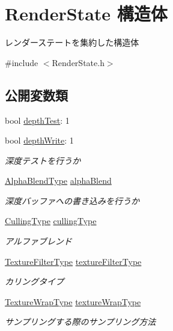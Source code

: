 \hypertarget{struct_render_state}{}\section{Render\+State 構造体}
\label{struct_render_state}


レンダーステートを集約した構造体  




{\ttfamily \#include $<$Render\+State.\+h$>$}

\subsection*{公開変数類}
\begin{DoxyCompactItemize}
\item 
bool \mbox{\hyperlink{struct_render_state_aa61ce61f3ea1393a390282c4812107bd}{depth\+Test}}\+: 1
\item 
bool \mbox{\hyperlink{struct_render_state_aa654d20df8b2f3405136082098b0397c}{depth\+Write}}\+: 1
\begin{DoxyCompactList}\small\item\em 深度テストを行うか \end{DoxyCompactList}\item 
\mbox{\hyperlink{_render_state_8h_a9700cc765f1d439500b41d8411f32036}{Alpha\+Blend\+Type}} \mbox{\hyperlink{struct_render_state_a7e18c4c10e6b76dedef6d8ffd519a7ca}{alpha\+Blend}}
\begin{DoxyCompactList}\small\item\em 深度バッファへの書き込みを行うか \end{DoxyCompactList}\item 
\mbox{\hyperlink{_render_state_8h_a09f66f004d665fd114424afb2fb42c75}{Culling\+Type}} \mbox{\hyperlink{struct_render_state_a2a951326c32d1319d5a7dd328db45ee2}{culling\+Type}}
\begin{DoxyCompactList}\small\item\em アルファブレンド \end{DoxyCompactList}\item 
\mbox{\hyperlink{_render_state_8h_a21d270ce58807e6b815650a47f4beba3}{Texture\+Filter\+Type}} \mbox{\hyperlink{struct_render_state_a22610d4664d4b8bc5481a75d782d5aef}{texture\+Filter\+Type}}
\begin{DoxyCompactList}\small\item\em カリングタイプ \end{DoxyCompactList}\item 
\mbox{\hyperlink{_render_state_8h_a7da0419d34309c6fd35bd55dcc01de2b}{Texture\+Wrap\+Type}} \mbox{\hyperlink{struct_render_state_a05e12034f4c324a83aa53d0da9be5ed3}{texture\+Wrap\+Type}}
\begin{DoxyCompactList}\small\item\em サンプリングする際のサンプリング方法 \end{DoxyCompactList}\end{DoxyCompactItemize}


